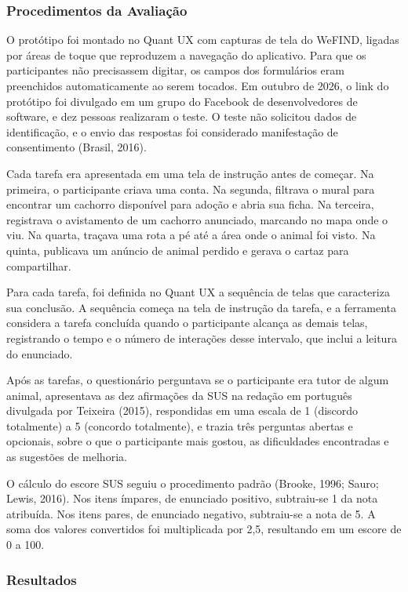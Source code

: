 \subsubsection{Procedimentos da Avaliação}

O protótipo foi montado no Quant UX com capturas de tela do WeFIND, ligadas por áreas de toque que reproduzem a navegação do aplicativo. Para que os participantes não precisassem digitar, os campos dos formulários eram preenchidos automaticamente ao serem tocados. Em outubro de 2026, o link do protótipo foi divulgado em um grupo do Facebook de desenvolvedores de software, e dez pessoas realizaram o teste. O teste não solicitou dados de identificação, e o envio das respostas foi considerado manifestação de consentimento (Brasil, 2016).

Cada tarefa era apresentada em uma tela de instrução antes de começar. Na primeira, o participante criava uma conta. Na segunda, filtrava o mural para encontrar um cachorro disponível para adoção e abria sua ficha. Na terceira, registrava o avistamento de um cachorro anunciado, marcando no mapa onde o viu. Na quarta, traçava uma rota a pé até a área onde o animal foi visto. Na quinta, publicava um anúncio de animal perdido e gerava o cartaz para compartilhar.

Para cada tarefa, foi definida no Quant UX a sequência de telas que caracteriza sua conclusão. A sequência começa na tela de instrução da tarefa, e a ferramenta considera a tarefa concluída quando o participante alcança as demais telas, registrando o tempo e o número de interações desse intervalo, que inclui a leitura do enunciado.

Após as tarefas, o questionário perguntava se o participante era tutor de algum animal, apresentava as dez afirmações da SUS na redação em português divulgada por Teixeira (2015), respondidas em uma escala de 1 (discordo totalmente) a 5 (concordo totalmente), e trazia três perguntas abertas e opcionais, sobre o que o participante mais gostou, as dificuldades encontradas e as sugestões de melhoria.

O cálculo do escore SUS seguiu o procedimento padrão (Brooke, 1996; Sauro; Lewis, 2016). Nos itens ímpares, de enunciado positivo, subtraiu-se 1 da nota atribuída. Nos itens pares, de enunciado negativo, subtraiu-se a nota de 5. A soma dos valores convertidos foi multiplicada por 2,5, resultando em um escore de 0 a 100.

\subsubsection{Resultados}

